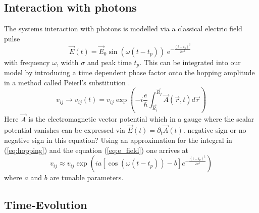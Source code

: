 \subsection{Interaction with photons}
The systems interaction with photons is modelled via a classical electric field pulse
\begin{equation}
    \Vec{E}(t) = \Vec{E}_0 \sin(\omega(t-t_p))\operatorname{e}^{-\frac{(t-t_p)^2}{2\sigma^2}} \label{eq:e_field}
\end{equation}
with frequency $\omega$, width $\sigma$ and peak time $t_p$. This can be integrated into our model by introducing a time dependent phase factor onto the hopping amplitude in a method called Peierl's substitution \cite{peierl}.
\begin{equation}
    v_{ij} \to v_{ij}(t) = v_{ij}\exp\left(-i\frac{e}{\hbar} \int_{\Vec{R}_i}^{\Vec{R}_j} \Vec{A}(\Vec{r},t) d\Vec{r}\right)\label{eq:hopping}
\end{equation}
Here $\Vec{A}$ is the electromagnetic vector potential which in a gauge where the scalar potential vanishes can be expressed via $\Vec{E}(t) = \partial_t \Vec{A}(t)$. {\color{red} negative sign or no negative sign in this equation?} Using an approximation for the integral in (\ref{eq:hopping}) and the equation (\ref{eq:e_field}) one arrives at
\begin{equation}
    v_{ij} \approx v_{ij} \exp\left(ia[\cos(\omega (t-t_p))-b] e^{-\frac{(t-t_p)^2}{2\sigma^2}}\right)
\end{equation}
where $a$ and $b$ are tunable parameters.


\subsection{Time-Evolution}

